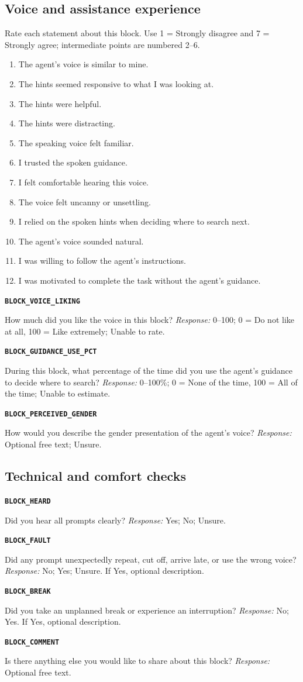 \documentclass[11pt,letterpaper]{article}
\newcommand{\qid}[1]{\par\smallskip\textbf{\texttt{#1}}\par}
\begin{document}
\subsection{Voice and assistance experience}
Rate each statement about this block. Use 1 = Strongly disagree and 7 = Strongly agree; intermediate points are numbered 2--6.
\begin{enumerate}
\item The agent's voice is similar to mine.
\item The hints seemed responsive to what I was looking at.
\item The hints were helpful.
\item The hints were distracting.
\item The speaking voice felt familiar.
\item I trusted the spoken guidance.
\item I felt comfortable hearing this voice.
\item The voice felt uncanny or unsettling.
\item I relied on the spoken hints when deciding where to search next.
\item The agent's voice sounded natural.
\item I was willing to follow the agent's instructions.
\item I was motivated to complete the task without the agent's guidance.
\end{enumerate}
\qid{BLOCK\_VOICE\_LIKING}
How much did you like the voice in this block?
\textit{Response:} 0--100; 0 = Do not like at all, 100 = Like extremely; Unable to rate.
\qid{BLOCK\_GUIDANCE\_USE\_PCT}
During this block, what percentage of the time did you use the agent's guidance to decide where to search?
\textit{Response:} 0--100\%; 0 = None of the time, 100 = All of the time; Unable to estimate.
\qid{BLOCK\_PERCEIVED\_GENDER}
How would you describe the gender presentation of the agent's voice?
\textit{Response:} Optional free text; Unsure.
\subsection{Technical and comfort checks}
\qid{BLOCK\_HEARD}
Did you hear all prompts clearly?
\textit{Response:} Yes; No; Unsure.
\qid{BLOCK\_FAULT}
Did any prompt unexpectedly repeat, cut off, arrive late, or use the wrong voice?
\textit{Response:} No; Yes; Unsure. If Yes, optional description.
\qid{BLOCK\_BREAK}
Did you take an unplanned break or experience an interruption?
\textit{Response:} No; Yes. If Yes, optional description.
\qid{BLOCK\_COMMENT}
Is there anything else you would like to share about this block?
\textit{Response:} Optional free text.
\end{document}
